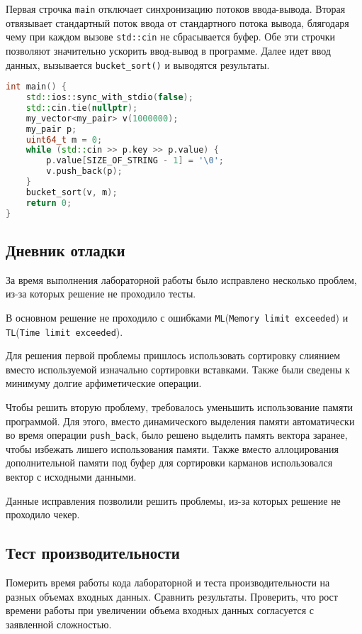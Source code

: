 \documentclass[12pt]{article}
\begin{document}
Первая строчка \texttt{main} отключает синхронизацию потоков ввода-вывода. Вторая отвязывает стандартный поток ввода от стандартного потока вывода, блягодаря чему при каждом вызове \texttt{std::cin} не сбрасывается буфер. Обе эти строчки позволяют значительно ускорить ввод-вывод в программе. Далее идет ввод данных, вызывается \texttt{bucket\_sort()} и выводятся результаты.

\begin{lstlisting}[language=C++]
int main() {
    std::ios::sync_with_stdio(false);
    std::cin.tie(nullptr);
    my_vector<my_pair> v(1000000);
    my_pair p;
    uint64_t m = 0;
    while (std::cin >> p.key >> p.value) {
        p.value[SIZE_OF_STRING - 1] = '\0';
        v.push_back(p);
    }
    bucket_sort(v, m);
    return 0;
}
\end{lstlisting}

\subsection*{Дневник отладки}

За время выполнения лабораторной работы было исправлено несколько проблем, из-за которых решение не проходило тесты.

В основном решение не проходило с ошибками \texttt{ML}(\texttt{Memory limit exceeded}) и \texttt{TL}(\texttt{Time limit exceeded}). 

Для решения первой проблемы пришлось использовать сортировку слиянием вместо используемой изначально сортировки вставками. Также были сведены к минимуму долгие арфиметические операции.

Чтобы решить вторую проблему, требовалось уменьшить использование памяти программой. Для этого, вместо динамического выделения памяти автоматически во время операции \texttt{push\_back}, было решено выделить память вектора заранее, чтобы избежать лишего использования памяти. Также вместо аллоцирования дополнительной памяти под буфер для сортировки карманов использовался вектор с исходными данными.

Данные исправления позволили решить проблемы, из-за которых решение не проходило чекер.

\subsection*{Тест производительности}

Померить время работы кода лабораторной и теста производительности
на разных объемах входных данных. Сравнить результаты. Проверить,
что рост времени работы при увеличении объема входных данных
согласуется с заявленной сложностью.
\end{document}
